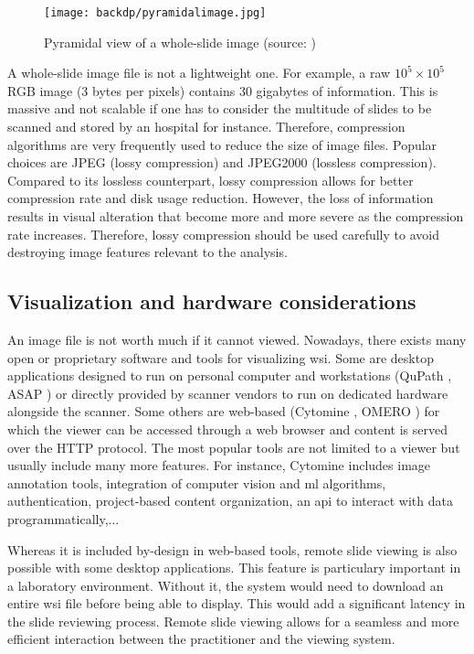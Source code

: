\begin{figure}
  \centering
  \texttt{[image: backdp/pyramidalimage.jpg]}
  \caption{Pyramidal view of a whole-slide image (source: \parencite{marini2022multi_scale_tools})}
  \label{fig:backdp:pyramidalimage}
\end{figure}

A whole-slide image file is not a lightweight one. For example, a raw $10^5 \times 10^5$ RGB image (3 bytes per pixels) contains 30 gigabytes of information. This is massive and not scalable if one has to consider the multitude of slides to be scanned and stored by an hospital for instance. Therefore, compression algorithms are very frequently used to reduce the size of image files. Popular choices are JPEG (lossy compression) and JPEG2000 (lossless compression). Compared to its lossless counterpart, lossy compression allows for better compression rate and disk usage reduction. However, the loss of information results in visual alteration that become more and more severe as the compression rate increases. Therefore, lossy compression should be used carefully to avoid destroying image features relevant to the analysis. 

\subsection{Visualization and hardware considerations}
\label{ssec:backdp:visualization}

An image file is not worth much if it cannot viewed. Nowadays, there exists many open or proprietary software and tools for visualizing \acrshort{wsi}. Some are desktop applications designed to run on personal computer and workstations (\eg QuPath \parencite{bankhead2017qupath}, ASAP \parencite{cpg2022asap}) or directly provided by scanner vendors to run on dedicated hardware alongside the scanner. Some others are web-based (\eg Cytomine \parencite{maree2016collaborative}, OMERO \parencite{allan2012omero}) for which the viewer can be accessed through a web browser and content is served over the HTTP protocol. The most popular tools are not limited to a viewer but usually include many more features. For instance, Cytomine includes image annotation tools, integration of computer vision and \acrlong{ml} algorithms, authentication, project-based content organization, an \acrshort{api} to interact with data programmatically,...

Whereas it is included by-design in web-based tools, remote slide viewing is also possible with some desktop applications. This feature is particulary important in a laboratory environment. Without it, the system would need to download an entire \acrshort{wsi} file before being able to display. This would add a significant latency in the slide reviewing process. Remote slide viewing allows for a seamless and more efficient interaction between the practitioner and the viewing system.

